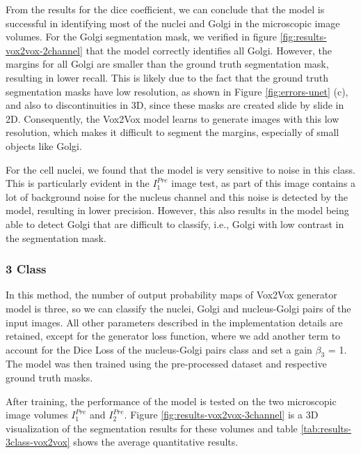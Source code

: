 From the results for the dice coefficient, we can conclude that the model is successful in identifying most of the nuclei and Golgi in the microscopic image volumes. For the Golgi segmentation mask, we verified in figure \ref{fig:results-vox2vox-2channel} that the model correctly identifies all Golgi. However, the margins for all Golgi are smaller than the ground truth segmentation mask, resulting in lower recall. This is likely due to the fact that the ground truth segmentation masks have low resolution, as shown in Figure \ref{fig:errors-unet} (c), and also to discontinuities in \ac{3D}, since these masks are created slide by slide in 2D. Consequently, the Vox2Vox model learns to generate images with this low resolution, which makes it difficult to segment the margins, especially of small objects like Golgi.

For the cell nuclei, we found that the model is very sensitive to noise in this class. This is particularly evident in the $I^{Pre}_1$ image test, as part of this image contains a lot of background noise for the nucleus channel and this noise is detected by the model, resulting in lower precision. However, this also results in the model being able to detect Golgi that are difficult to classify, i.e., Golgi with low contrast in the segmentation mask.


\subsubsection*{3 Class}

In this method, the number of output probability maps of Vox2Vox generator model is three, so we can classify the nuclei, Golgi and nucleus-Golgi pairs of the input images. All other parameters described in the implementation details are retained, except for the generator loss function, where we add another term to account for the Dice Loss of the nucleus-Golgi pairs class and set a gain $\beta_3$ = 1. The model was then trained using the pre-processed dataset and respective ground truth masks.

After training, the performance of the model is tested on the two microscopic image volumes $I^{Pre}_1$ and $I^{Pre}_2$. Figure \ref{fig:results-vox2vox-3channel} is a 3D visualization of the segmentation results for these volumes and table \ref{tab:results-3class-vox2vox} shows the average quantitative results.

\begin{table}[!htb]
\centering
\caption{Average metric values obtained from testing the 3 class Vox2Vox model on two pre-processed microscopic images}
\label{tab:results-3class-vox2vox}
\end{table}

